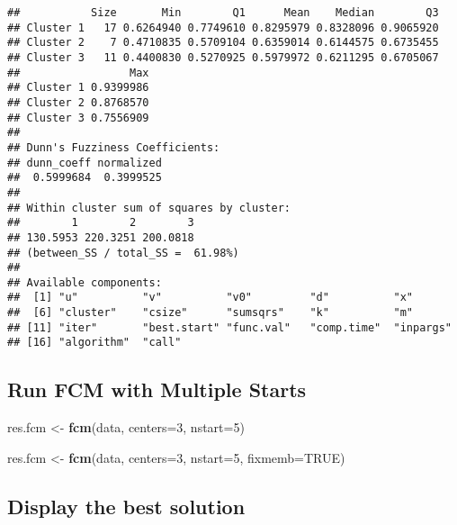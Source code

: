 \documentclass[
]{elegantbook}
\newenvironment{Shaded}{\begin{snugshade}}{\end{snugshade}}
\newcommand{\AttributeTok}[1]{\textcolor[rgb]{0.13,0.29,0.53}{#1}}
\newcommand{\ConstantTok}[1]{\textcolor[rgb]{0.56,0.35,0.01}{#1}}
\newcommand{\DecValTok}[1]{\textcolor[rgb]{0.00,0.00,0.81}{#1}}
\newcommand{\FunctionTok}[1]{\textcolor[rgb]{0.13,0.29,0.53}{\textbf{#1}}}
\newcommand{\NormalTok}[1]{#1}
\newcommand{\OtherTok}[1]{\textcolor[rgb]{0.56,0.35,0.01}{#1}}
\newcommand{\SpecialCharTok}[1]{\textcolor[rgb]{0.81,0.36,0.00}{\textbf{#1}}}
\begin{document}
\begin{verbatim}
##           Size       Min        Q1      Mean    Median        Q3
## Cluster 1   17 0.6264940 0.7749610 0.8295979 0.8328096 0.9065920
## Cluster 2    7 0.4710835 0.5709104 0.6359014 0.6144575 0.6735455
## Cluster 3   11 0.4400830 0.5270925 0.5979972 0.6211295 0.6705067
##                 Max
## Cluster 1 0.9399986
## Cluster 2 0.8768570
## Cluster 3 0.7556909
## 
## Dunn's Fuzziness Coefficients:
## dunn_coeff normalized 
##  0.5999684  0.3999525 
## 
## Within cluster sum of squares by cluster:
##        1        2        3 
## 130.5953 220.3251 200.0818 
## (between_SS / total_SS =  61.98%) 
## 
## Available components: 
##  [1] "u"          "v"          "v0"         "d"          "x"         
##  [6] "cluster"    "csize"      "sumsqrs"    "k"          "m"         
## [11] "iter"       "best.start" "func.val"   "comp.time"  "inpargs"   
## [16] "algorithm"  "call"
\end{verbatim}

\hypertarget{run-fcm-with-multiple-starts}{%
\subsection{Run FCM with Multiple Starts}\label{run-fcm-with-multiple-starts}}

\begin{Shaded}
\begin{Highlighting}[]
\NormalTok{res.fcm }\OtherTok{\textless{}{-}} \FunctionTok{fcm}\NormalTok{(data, }\AttributeTok{centers=}\DecValTok{3}\NormalTok{, }\AttributeTok{nstart=}\DecValTok{5}\NormalTok{)}
\end{Highlighting}
\end{Shaded}

\begin{Shaded}
\begin{Highlighting}[]
\NormalTok{res.fcm }\OtherTok{\textless{}{-}} \FunctionTok{fcm}\NormalTok{(data, }\AttributeTok{centers=}\DecValTok{3}\NormalTok{, }\AttributeTok{nstart=}\DecValTok{5}\NormalTok{, }\AttributeTok{fixmemb=}\ConstantTok{TRUE}\NormalTok{)}
\end{Highlighting}
\end{Shaded}

\hypertarget{display-the-best-solution}{%
\subsection{Display the best solution}\label{display-the-best-solution}}

\begin{Shaded}
\end{Shaded}
\end{document}
